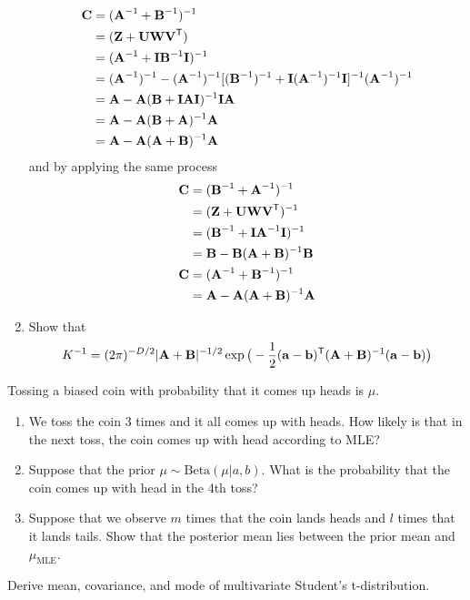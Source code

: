 \documentclass{amsmlaj}
\begin{document}
\begin{problem}
\begin{enumerate}
	\begin{equation}
		\begin{split}
			\bm{\mathbf{C}}&=(\bm{\mathbf{A}}^{-1}+\bm{\mathbf{B}}^{-1})^{-1} \\
			&=(\bm{\mathbf{Z}}+\bm{\mathbf{U}}\bm{\mathbf{W}}\bm{\mathbf{V}}^{\mathsf{T}}) \\
			&=(\bm{\mathbf{A}}^{-1}+\bm{\mathbf{I}}\bm{\mathbf{B}}^{-1}\bm{\mathbf{I}})^{-1} \\
			&=(\bm{\mathbf{A}}^{-1})^{-1}-(\bm{\mathbf{A}}^{-1})^{-1}[(\bm{\mathbf{B}}^{-1})^{-1}
			+\bm{\mathbf{I}}(\bm{\mathbf{A}}^{-1})^{-1}\bm{\mathbf{I}}]^{-1}(\bm{\mathbf{A}}^{-1})^{-1} \\
			&=\bm{\mathbf{A}}-\bm{\mathbf{A}}(\bm{\mathbf{B}}+\bm{\mathbf{I}}\bm{\mathbf{A}}\bm{\mathbf{I}})^{-1}\bm{\mathbf{I}}\bm{\mathbf{A}} \\
			&=\bm{\mathbf{A}}-\bm{\mathbf{A}}(\bm{\mathbf{B}}+\bm{\mathbf{A}})^{-1}\bm{\mathbf{A}} \\
			&=\bm{\mathbf{A}}-\bm{\mathbf{A}}(\bm{\mathbf{A}}+\bm{\mathbf{B}})^{-1}\bm{\mathbf{A}}
		\end{split}
	\end{equation}
	and by applying the same process
	\begin{equation}
		\begin{split}
			\bm{\mathbf{C}}&=(\bm{\mathbf{B}}^{-1}+\bm{\mathbf{A}}^{-1})^{-1} \\
			&=(\bm{\mathbf{Z}}+\bm{\mathbf{U}}\bm{\mathbf{W}}\bm{\mathbf{V}}^{\mathsf{T}})^{-1} \\
			&=(\bm{\mathbf{B}}^{-1}+\bm{\mathbf{I}}\bm{\mathbf{A}}^{-1}\bm{\mathbf{I}})^{-1} \\
			&=\bm{\mathbf{B}}-\bm{\mathbf{B}}(\bm{\mathbf{A}}+\bm{\mathbf{B}})^{-1}\bm{\mathbf{B}} \\
			\bm{\mathbf{C}}&=(\bm{\mathbf{A}}^{-1}+\bm{\mathbf{B}}^{-1})^{-1} \\
			&=\bm{\mathbf{A}}-\bm{\mathbf{A}}(\bm{\mathbf{A}}+\bm{\mathbf{B}})^{-1}\bm{\mathbf{A}}
		\end{split}
	\end{equation}

\item Show that
				\begin{equation}
								K^{-1} = (2\pi)^{-D/2}|\bm{\mathbf{A}}+\bm{\mathbf{B}}|^{-1/2}
								\exp\big( -\frac{1}{2}(\bm{\mathbf{a}}-\bm{\mathbf{b}})^{\mathsf{T}}
								(\bm{\mathbf{A}}+\bm{\mathbf{B}})^{-1} (\bm{\mathbf{a}}-\bm{\mathbf{b}})\big)
				\end{equation}
\end{enumerate}
\end{problem}


\begin{problem}
Tossing a biased coin with probability that it comes up heads is $\mu$. 
\begin{enumerate}
\item We toss the coin 3 times and it all comes up with heads.
				How likely is that in the next toss, the coin comes up
				with head according to MLE?
\item Suppose that the prior $\mu \sim \text{Beta}(\mu|a,b)$.
				What is the probability  that the coin comes up with
				head in the 4th toss?
\item Suppose that we observe $m$ times that the coin lands
				heads and $l$ times that it lands tails. Show that the
				posterior mean lies between the prior mean and
				$\mu_{\text{MLE}}$.
\end{enumerate}
\end{problem}

\begin{extraproblem}
Derive mean, covariance, and mode of multivariate Student's
t-distribution.
\end{extraproblem}
\end{document}
